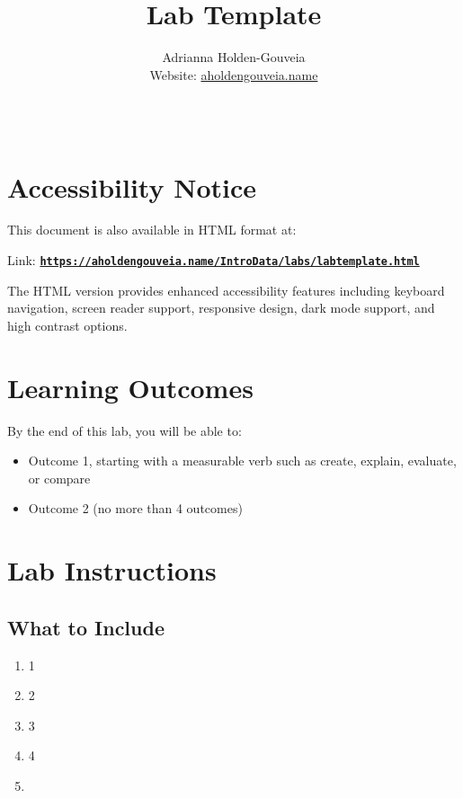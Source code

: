 \documentclass[12pt]{article}
\title{Lab Template}
\author{
        Adrianna Holden-Gouveia \\
        Website: \href{https://aholdengouveia.name}{aholdengouveia.name}\\ 
        \date{\vspace{-5ex}}
        \faGithub {: aholdengouveia} \\
        }
\begin{document}
    

\maketitle


\section*{Accessibility Notice}
This document is also available in HTML format at:

Link: \href{https://aholdengouveia.name/IntroData/labs/labtemplate.html}{\textbf{\nolinkurl{https://aholdengouveia.name/IntroData/labs/labtemplate.html}}}

The HTML version provides enhanced accessibility features including keyboard navigation, screen reader support, responsive design, dark mode support, and high contrast options.

\section*{Learning Outcomes}
By the end of this lab, you will be able to:
\begin{itemize}
    \item Outcome 1, starting with a measurable verb such as create, explain, evaluate, or compare
    \item Outcome 2 (no more than 4 outcomes)
\end{itemize}

\section*{Lab Instructions}


\subsection*{What to Include}
    \begin{enumerate}
        \item 1
        \item 2
        \item 3
        \item 4
        \item 


    \end{enumerate}
\end{document}
